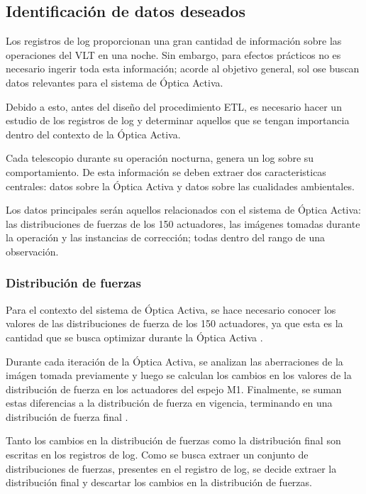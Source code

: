 
\subsection{Identificación de datos deseados}

Los registros de log proporcionan una gran cantidad de información sobre las operaciones del VLT en una noche. Sin embargo, para efectos prácticos no es necesario ingerir toda esta información; acorde al objetivo general, sol ose buscan datos relevantes para el sistema de Óptica Activa.

Debido a esto, antes del diseño del procedimiento ETL, es necesario hacer un estudio de los registros de log y determinar aquellos que se tengan importancia dentro del contexto de la Óptica Activa.

Cada telescopio durante su operación nocturna, genera un log sobre su comportamiento. De esta información se deben extraer dos caracteristicas centrales: datos sobre la Óptica Activa y datos sobre las cualidades ambientales.

Los datos principales serán aquellos relacionados con el sistema de Óptica Activa: las distribuciones de fuerzas de los 150 actuadores, las imágenes tomadas durante la operación y las instancias de corrección; todas dentro del rango de una observación.

\subsubsection{Distribución de fuerzas}

Para el contexto del sistema de Óptica Activa, se hace necesario conocer los valores de las distribuciones de fuerza de los 150 actuadores, ya que esta es la cantidad que se busca optimizar durante la Óptica Activa \cite{eso1998vlt}. 

Durante cada iteración de la Óptica Activa, se analizan las aberraciones de la imágen tomada previamente y luego se calculan los cambios en los valores de la distribución de fuerza en los actuadores del espejo M1. Finalmente, se suman estas diferencias a la distribución de fuerza en vigencia, terminando en una distribución de fuerza final \cite{wilson1987active}.

Tanto los cambios en la distribución de fuerzas como la distribución final son escritas en los registros de log. Como se busca extraer un conjunto de distribuciones de fuerzas, presentes en el registro de log, se decide extraer la distribución final y descartar los cambios en la distribución de fuerzas.


